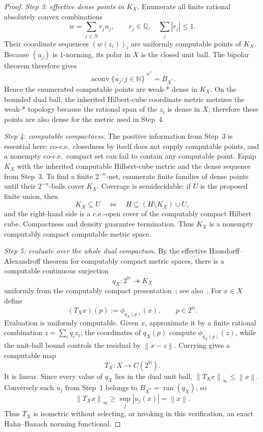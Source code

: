 \documentclass[11pt]{article}
\theoremstyle{definition}
\newcommand{\norm}[1]{\left\lVert #1 \right\rVert}
\newcommand{\abs}[1]{\left\lvert #1 \right\rvert}
\newcommand{\N}{\mathbb{N}}
\newcommand{\Q}{\mathbb{Q}}
\newcommand{\aconv}{\operatorname{aconv}}
\newcommand{\range}{\operatorname{ran}}
\begin{document}
\begin{proof}
\smallskip
\noindent\emph{Step 3: effective dense points in $K_X$.}
Enumerate all finite rational absolutely convex combinations
\[
 w=\sum_{j\le N} r_j u_j,
 \qquad r_j\in\Q,\quad \sum_j\abs{r_j}\le1.
\]
Their coordinate sequences $(w(z_i))_i$ are uniformly computable points of $K_X$.
Because $(u_j)$ is $1$-norming, its polar in $X$ is the closed unit ball.  The bipolar
theorem therefore gives
\[
 \overline{\aconv\{u_j:j\in\N\}}^{\;w^*}=B_{X^*}.
\]
Hence the enumerated computable points are weak-* dense in $K_X$.  On the bounded dual
ball, the inherited Hilbert-cube coordinate metric metrizes the weak-* topology because the
rational span of the $z_i$ is dense in $X$; therefore these points are also dense for the
metric used in Step~4.

\smallskip
\noindent\emph{Step 4: computable compactness.}
The positive information from Step~3 is essential here: co-c.e.\ closedness by itself does
not supply computable points, and a nonempty co-c.e.\ compact set can fail to contain any
computable point.  Equip $K_X$ with the inherited computable Hilbert-cube metric and the
dense sequence from Step~3.  To find a finite $2^{-n}$-net, enumerate finite families of dense points until
their $2^{-n}$-balls cover $K_X$.  Coverage is semidecidable: if $U$ is the proposed
finite union, then
\[
 K_X\subseteq U
 \quad\Longleftrightarrow\quad
 H\subseteq (H\setminus K_X)\cup U,
\]
and the right-hand side is a c.e.-open cover of the computably compact Hilbert cube.
Compactness and density guarantee termination.  Thus $K_X$ is a nonempty computably
compact computable metric space.

\smallskip
\noindent\emph{Step 5: evaluate over the whole dual compactum.}
By the effective Hausdorff--Alexandroff theorem for computably compact metric spaces,
there is a computable continuous surjection
\[
 q_X:2^{\N}\twoheadrightarrow K_X
\]
uniformly from the computably compact presentation~\cite[Prop.~4.1]{BrattkaDeBrechtPauly};
see also~\cite[Thm.~3.40]{DowneyMelnikov}.
For $x\in X$ define
\[
 (T_Xx)(p):=\phi_{q_X(p)}(x),
 \qquad p\in2^{\N}.
\]
Evaluation is uniformly computable.  Given $x$, approximate it by a finite rational
combination $z=\sum_i q_i z_i$; the coordinates of $q_X(p)$ compute
$\phi_{q_X(p)}(z)$, while the unit-ball bound controls the residual by
$\norm{x-z}$.  Currying gives a computable map
\[
 T_X:X\to C(2^{\N}).
\]
It is linear.  Since every value of $q_X$ lies in the dual unit ball,
$\norm{T_Xx}_{\infty}\le\norm x$.  Conversely each $u_j$ from Step~1 belongs to
$B_{X^*}=\range(q_X)$, so
\[
 \norm{T_Xx}_{\infty}
 \ge \sup_j\abs{u_j(x)}
 =\norm x.
\]
Thus $T_X$ is isometric without selecting, or invoking in this verification, an exact
Hahn--Banach norming functional.


\end{proof}
\end{document}
